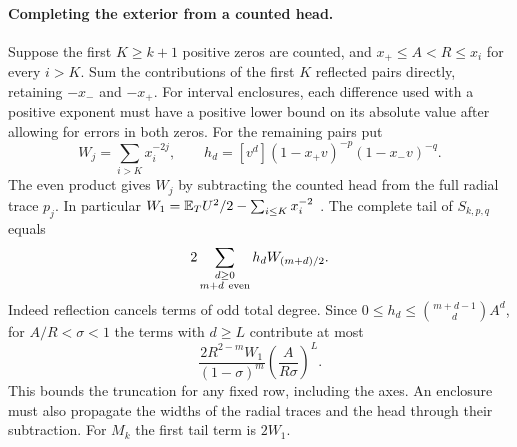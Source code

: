 \paragraph{Completing the exterior from a counted head.}
Suppose the first \(K\ge k+1\) positive zeros are counted, and
\(x_+\le A<R\le x_i\) for every \(i>K\). Sum the contributions of the
first \(K\) reflected pairs directly, retaining \(-x_-\) and \(-x_+\).
For interval enclosures, each difference used with a positive exponent
must have a positive lower bound on its absolute value after allowing for
errors in both zeros. For the remaining pairs put
\[
 W_j=\sum_{i>K}x_i^{-2j},\qquad
 h_d=[v^d](1-x_+v)^{-p}(1-x_-v)^{-q}.
\]
The even product gives \(W_j\) by subtracting the counted head from the
full radial trace \(p_j\). In particular
\(W_1=\mathbb E_T U^2/2-\sum_{i\le K}x_i^{-2}\)
\cite{Founding07,EZMixedAnchor}. The complete tail of \(S_{k,p,q}\) equals
\begin{equation}\label{eq:exterior-tail}
 2\sum_{\substack{d\ge0\\m+d\ {\rm even}}} h_d W_{(m+d)/2}.
\end{equation}
Indeed reflection cancels terms of odd total degree. Since
\(0\le h_d\le \binom{m+d-1}{d} A^d\), for \(A/R<\sigma<1\)
the terms with \(d\ge L\) contribute at most
\[
  \frac{2R^{2-m} W_1}{(1-\sigma)^m}
       \left(\frac{A}{R\sigma}\right)^L .
\]
This bounds the truncation for any fixed row, including the axes.
An enclosure must also propagate the widths of the radial traces and
the head through their subtraction. For \(M_k\) the first tail term is
\(2W_1\).

